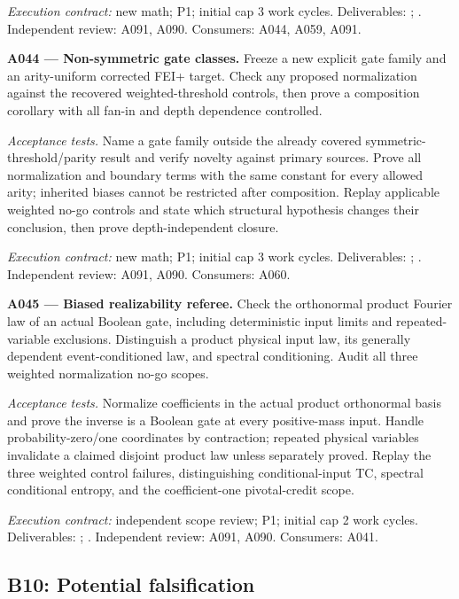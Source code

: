 \documentclass[11pt]{article}
\begin{document}
{\small\emph{Execution contract:} new math; P1; initial cap 3 work cycles. Deliverables: ; . Independent review: A091, A090. Consumers: A044, A059, A091.}

\textbf{A044 --- Non-symmetric gate classes.} Freeze a new explicit gate family and an arity-uniform corrected FEI+ target. Check any proposed normalization against the recovered weighted-threshold controls, then prove a composition corollary with all fan-in and depth dependence controlled.

\emph{Acceptance tests.} Name a gate family outside the already covered symmetric-threshold/parity result and verify novelty against primary sources. Prove all normalization and boundary terms with the same constant for every allowed arity; inherited biases cannot be restricted after composition. Replay applicable weighted no-go controls and state which structural hypothesis changes their conclusion, then prove depth-independent closure.

{\small\emph{Execution contract:} new math; P1; initial cap 3 work cycles. Deliverables: ; . Independent review: A091, A090. Consumers: A060.}

\textbf{A045 --- Biased realizability referee.} Check the orthonormal product Fourier law of an actual Boolean gate, including deterministic input limits and repeated-variable exclusions. Distinguish a product physical input law, its generally dependent event-conditioned law, and spectral conditioning. Audit all three weighted normalization no-go scopes.

\emph{Acceptance tests.} Normalize coefficients in the actual product orthonormal basis and prove the inverse is a Boolean gate at every positive-mass input. Handle probability-zero/one coordinates by contraction; repeated physical variables invalidate a claimed disjoint product law unless separately proved. Replay the three weighted control failures, distinguishing conditional-input TC, spectral conditional entropy, and the coefficient-one pivotal-credit scope.

{\small\emph{Execution contract:} independent scope review; P1; initial cap 2 work cycles. Deliverables: ; . Independent review: A091, A090. Consumers: A041.}

\subsection{B10: Potential falsification}
\end{document}
